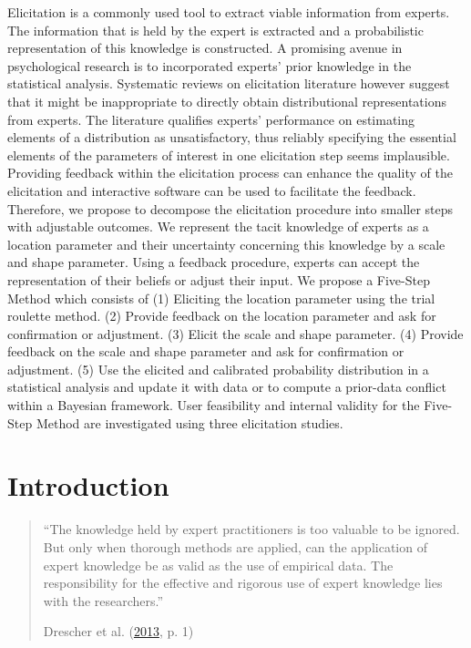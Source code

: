 \documentclass[openright,titlepage,12pt,a4paper]{book}
\begin{document}
\small

Elicitation is a commonly used tool to extract viable information from experts. The information that is held by the expert is extracted and a probabilistic representation of this knowledge is constructed. A promising avenue in psychological research is to incorporated experts' prior knowledge in the statistical analysis. Systematic reviews on elicitation literature however suggest that it might be inappropriate to directly obtain distributional representations from experts. The literature qualifies experts' performance on estimating elements of a distribution as unsatisfactory, thus reliably specifying the essential elements of the parameters of interest in one elicitation step seems implausible. Providing feedback within the elicitation process can enhance the quality of the elicitation and interactive software can be used to facilitate the feedback. Therefore, we propose to decompose the elicitation procedure into smaller steps with adjustable outcomes. We represent the tacit knowledge of experts as a location parameter and their uncertainty concerning this knowledge by a scale and shape parameter. Using a feedback procedure, experts can accept the representation of their beliefs or adjust their input. We propose a Five-Step Method which consists of (1) Eliciting the location parameter using the trial roulette method. (2) Provide feedback on the location parameter and ask for confirmation or adjustment. (3) Elicit the scale and shape parameter. (4) Provide feedback on the scale and shape parameter and ask for confirmation or adjustment. (5) Use the elicited and calibrated probability distribution in a statistical analysis and update it with data or to compute a prior-data conflict within a Bayesian framework. User feasibility and internal validity for the Five-Step Method are investigated using three elicitation studies.

\normalsize
\newpage

\hypertarget{ch02introduction}{%
\section{Introduction}\label{ch02introduction}}

\begin{quote}
``The knowledge held by expert practitioners is too valuable to be ignored. But only when thorough methods are applied, can the application of expert knowledge be as valid as the use of empirical data. The responsibility for the effective and rigorous use of expert knowledge lies with the researchers.''

Drescher et al. (\protect\hyperlink{ref-drescher_toward_2013}{2013}, p. 1)
\end{quote}
\end{document}
